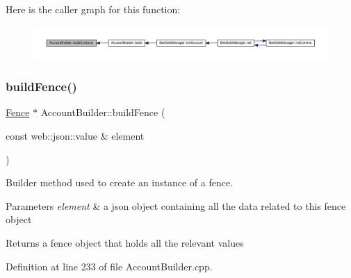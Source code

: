 Here is the caller graph for this function\+:
\nopagebreak
\begin{figure}[H]
\begin{center}
\leavevmode
\includegraphics[width=350pt]{d9/daa/class_account_builder_aa3af3cf2501508d76ee3f7140deeba80_icgraph}
\end{center}
\end{figure}
\mbox{\label{class_account_builder_ac5801a1130d7a1f84a66c45cfd6e0a8d}} 
\subsubsection{\texorpdfstring{build\+Fence()}{buildFence()}}
{\footnotesize\ttfamily \hyperlink{class_fence}{Fence} $\ast$ Account\+Builder\+::build\+Fence (\begin{DoxyParamCaption}\item[{const web\+::json\+::value \&}]{element }\end{DoxyParamCaption})\hspace{0.3cm}{\ttfamily [private]}}

Builder method used to create an instance of a fence.


\begin{DoxyParams}{Parameters}
{\em element} & a json object containing all the data related to this fence object \\
\hline
\end{DoxyParams}
\begin{DoxyReturn}{Returns}
a fence object that holds all the relevant values 
\end{DoxyReturn}


Definition at line 233 of file Account\+Builder.\+cpp.


